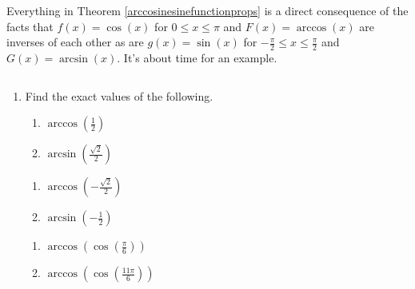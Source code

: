 \pagebreak

Everything in Theorem \ref{arccosinesinefunctionprops} is a direct consequence of the facts that $f(x) = \cos(x)$ for $0 \leq x \leq \pi$ and $F(x) = \arccos(x)$ are inverses of each other as are $g(x) = \sin(x)$ for $-\frac{\pi}{2} \leq x \leq \frac{\pi}{2}$ and $G(x) = \arcsin(x)$.  It's about time for an example.

\begin{ex}  \label{arccosinesineex} $~$

\begin{enumerate}  

\item Find the exact values of the following.

\begin{multicols}{2}

\begin{enumerate}

\item  $\arccos\left(\frac{1}{2}\right)$ 
\item  $\arcsin\left(\frac{\sqrt{2}}{2}\right)$

\setcounter{HW}{\value{enumii}}

\end{enumerate}

\end{multicols}

\begin{multicols}{2}

\begin{enumerate}

\setcounter{enumii}{\value{HW}}

\item  $\arccos\left(-\frac{\sqrt{2}}{2}\right)$
\item  $\arcsin\left(-\frac{1}{2}\right)$

\setcounter{HW}{\value{enumii}}

\end{enumerate}

\end{multicols}

\begin{multicols}{2}

\begin{enumerate}

\setcounter{enumii}{\value{HW}}

\item  $\arccos\left( \cos\left(\frac{\pi}{6}\right)\right)$
\item  $\arccos\left( \cos\left(\frac{11\pi}{6}\right)\right)$


\end{enumerate}
\end{multicols}
\end{enumerate}
\end{ex}
